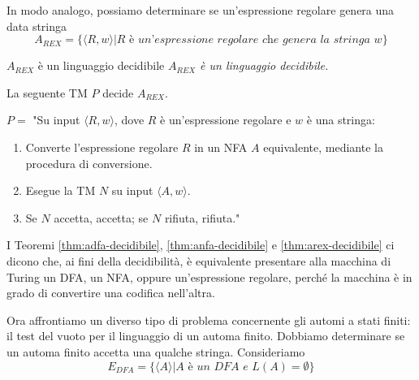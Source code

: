 In modo analogo, possiamo determinare se un'espressione regolare genera una data stringa
\begin{equation*}
A_{REX} = \{\langle R, w\rangle | R\textit{ è un'espressione regolare che genera la stringa }w\}
\end{equation*}

\begin{Thm}{$A_{REX}$ è un linguaggio decidibile}{}\label{thm:arex-decidibile}
\textit{$A_{REX}$ è un linguaggio decidibile.}

\begin{demonstration}
La seguente TM $P$ decide $A_{REX}$.

$P=$ "Su input $\langle R, w\rangle $, dove $R$ è un'espressione regolare e $w$ è una stringa: 
\begin{enumerate}
    \item Converte l'espressione regolare $R$ in un NFA $A$ equivalente, mediante la procedura di conversione.
    \item Esegue la TM $N$ su input $\langle A, w\rangle $.
    \item Se $N$ accetta, accetta; se $N$ rifiuta, rifiuta."
\end{enumerate}
\end{demonstration}
\end{Thm}

I Teoremi \ref{thm:adfa-decidibile}, \ref{thm:anfa-decidibile} e \ref{thm:arex-decidibile} ci dicono che, ai fini della decidibilità, è equivalente presentare alla macchina di Turing un DFA, un NFA, oppure un'espressione regolare, perché la macchina è in grado di convertire una codifica nell'altra.

Ora affrontiamo un diverso tipo di problema concernente gli automi a stati finiti: il test del vuoto per il linguaggio di un automa finito. Dobbiamo determinare se un automa finito accetta una qualche stringa. Consideriamo
\begin{equation*}
E_{DFA}=\{\langle A\rangle| A\textit{ è un DFA e }L(A) = \emptyset\}
\end{equation*}

